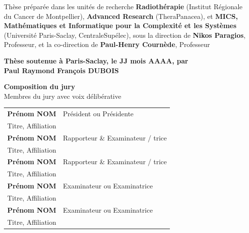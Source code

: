 \begin{titlepage}
	\footnotesize Thèse préparée dans les unités de recherche \textbf{Radiothérapie} (Institut Régionale du Cancer de Montpellier), \textbf{Advanced Research} (TheraPanacea), et \textbf{MICS, Mathématiques et Informatique pour la Complexité et les Systèmes} (Université Paris-Saclay, CentraleSupélec), sous la direction de \textbf{Nikos Paragios}, Professeur, et la co-direction de \textbf{Paul-Henry Cournède}, Professeur\\
	\vspace{15mm}
	
	\textbf{Thèse soutenue à Paris-Saclay, le JJ mois AAAA, par}\\
	\bigskip
	\Large {\color{Prune} \textbf{Paul Raymond François DUBOIS}} %
	
	\vspace{\fill} %
	
	\bigskip
	
	\flushleft
	\small {\color{Prune} \textbf{Composition du jury}}\\
	{\color{Prune} \scriptsize {Membres du jury avec voix délibérative}} \\
	\vspace{2mm}
	\scriptsize
	\begin{tabular}{|p{7cm}l}
		\arrayrulecolor{Prune}
		\textbf{Prénom NOM} &   Président ou Présidente\\ 
		Titre, Affiliation & \\
		\textbf{Prénom NOM} &  Rapporteur \& Examinateur / trice \\ 
		Titre, Affiliation   &   \\ 
		\textbf{Prénom NOM} &  Rapporteur \& Examinateur / trice \\ 
		Titre, Affiliation  &   \\ 
		\textbf{Prénom NOM} &  Examinateur ou Examinatrice \\ 
		Titre, Affiliation   &   \\ 
		\textbf{Prénom NOM} &  Examinateur ou Examinatrice \\ 
		Titre, Affiliation   &   \\ 
		
		
	\end{tabular} 
	
\end{titlepage}